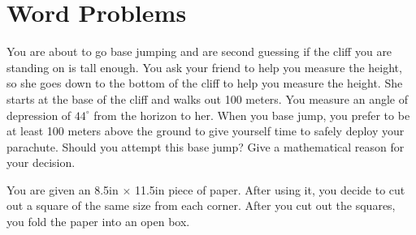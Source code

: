 \documentclass[../main.tex]{subfiles}
\begin{document}
\section*{Word Problems}
    \begin{questions}
    \setcounter{question}{55}
    
    \question[1] You are about to go base jumping and are second guessing if the cliff you are standing on is tall enough. You ask your friend to help you measure the height, so she goes down to the bottom of the cliff to help you measure the height. She starts at the base of the cliff and walks out 100 meters. You measure an angle of depression of $44^\circ$ from the horizon to her. When you base jump, you prefer to be at least 100 meters above the ground to give yourself time to safely deploy your parachute. Should you attempt this base jump? Give a mathematical reason for your decision.

        \vspace{0.5cm}
         
        

    \question[1] You are given an 8.5in $\times$ 11.5in piece of paper. After using it, you decide to cut out a square of the same size from each corner. After you cut out the squares, you fold the paper into an open box.
\end{questions}
\end{document}

